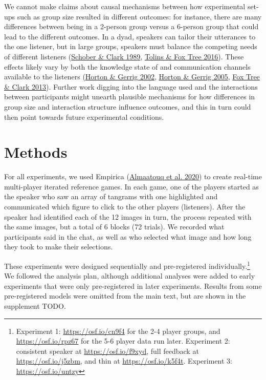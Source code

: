 \documentclass[
  english,
  a4paper,
]{article}
\begin{document}
We cannot make claims about causal mechanisms between how experimental set-ups such as group size resulted in different outcomes: for instance, there are many differences between being in a 2-person group versus a 6-person group that could lead to the different outcomes. In a dyad, speakers can tailor their utterances to the one listener, but in large groups, speakers must balance the competing needs of different listeners (\protect\hyperlink{ref-schober1989}{Schober \& Clark 1989}, \protect\hyperlink{ref-tolins2016}{Tolins \& Fox Tree 2016}). These effects likely vary by both the knowledge state of and communication channels available to the listeners (\protect\hyperlink{ref-horton2002}{Horton \& Gerrig 2002}, \protect\hyperlink{ref-horton2005}{Horton \& Gerrig 2005}, \protect\hyperlink{ref-fox-tree2013}{Fox Tree \& Clark 2013}). Further work digging into the language used and the interactions between participants might unearth plausible mechanisms for how differences in group size and interaction structure influence outcomes, and this in turn could then point towards future experimental conditions.

\hypertarget{methods}{%
\section{Methods}\label{methods}}

For all experiments, we used Empirica (\protect\hyperlink{ref-almaatouq2020}{Almaatouq et al. 2020}) to create real-time multi-player iterated reference games. In each game, one of the players started as the speaker who saw an array of tangrams with one highlighted and communicated which figure to click to the other players (listeners). After the speaker had identified each of the 12 images in turn, the process repeated with the same images, but a total of 6 blocks (72 trials). We recorded what participants said in the chat, as well as who selected what image and how long they took to make their selections.

These experiments were designed sequentially and pre-registered individually.\footnote{Experiment 1: \url{https://osf.io/cn9f4} for the 2-4 player groups, and \url{https://osf.io/rpz67} for the 5-6 player data run later. Experiment 2: consistent speaker at \url{https://osf.io/f9xyd}, full feedback at \url{https://osf.io/j5zbm}, and thin at \url{https://osf.io/k5f4t}. Experiment 3: \url{https://osf.io/untzy}} We followed the analysis plan, although additional analyses were added to early experiments that were only pre-registered in later experiments. Results from some pre-registered models were omitted from the main text, but are shown in the supplement TODO.
\end{document}
